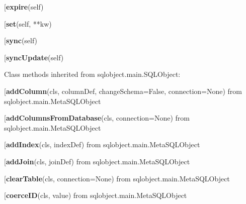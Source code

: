 \begin{description}\item[{\bf expire}(self)\end{description}

\begin{description}\item[{\bf set}(self, **kw)\end{description}

\begin{description}\item[{\bf sync}(self)\end{description}

\begin{description}\item[{\bf syncUpdate}(self)\end{description}


Class methods inherited from sqlobject.main.SQLObject:\\
\begin{description}\item[{\bf addColumn}(cls, columnDef, changeSchema=False, connection=None) from sqlobject.main.MetaSQLObject\end{description}

\begin{description}\item[{\bf addColumnsFromDatabase}(cls, connection=None) from sqlobject.main.MetaSQLObject\end{description}

\begin{description}\item[{\bf addIndex}(cls, indexDef) from sqlobject.main.MetaSQLObject\end{description}

\begin{description}\item[{\bf addJoin}(cls, joinDef) from sqlobject.main.MetaSQLObject\end{description}

\begin{description}\item[{\bf clearTable}(cls, connection=None) from sqlobject.main.MetaSQLObject\end{description}

\begin{description}\item[{\bf coerceID}(cls, value) from sqlobject.main.MetaSQLObject\end{description}

